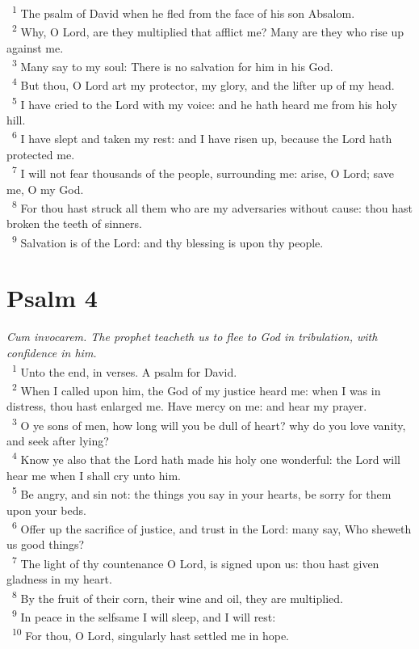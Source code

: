 \documentclass[a5paper,12pt]{article}
\begin{document}
\begin{multicols*}{2}
~\textsuperscript{1} The psalm of David when he fled from the face of his son Absalom.\\
~\textsuperscript{2} Why, O Lord, are they multiplied that afflict me? Many are they who rise up against me.\\
~\textsuperscript{3} Many say to my soul: There is no salvation for him in his God.\\
~\textsuperscript{4} But thou, O Lord art my protector, my glory, and the lifter up of my head.\\
~\textsuperscript{5} I have cried to the Lord with my voice: and he hath heard me from his holy hill.\\
~\textsuperscript{6} I have slept and taken my rest: and I have risen up, because the Lord hath protected me.\\
~\textsuperscript{7} I will not fear thousands of the people, surrounding me: arise, O Lord; save me, O my God.\\
~\textsuperscript{8} For thou hast struck all them who are my adversaries without cause: thou hast broken the teeth of sinners.\\
~\textsuperscript{9} Salvation is of the Lord: and thy blessing is upon thy people.\\

\section{Psalm 4}
\label{sec:org0904b75}
\emph{Cum invocarem. The prophet teacheth us to flee to God in tribulation, with confidence in him.}\\

~\textsuperscript{1} Unto the end, in verses. A psalm for David.\\
~\textsuperscript{2} When I called upon him, the God of my justice heard me: when I was in distress, thou hast enlarged me. Have mercy on me: and hear my prayer.\\
~\textsuperscript{3} O ye sons of men, how long will you be dull of heart? why do you love vanity, and seek after lying?\\
~\textsuperscript{4} Know ye also that the Lord hath made his holy one wonderful: the Lord will hear me when I shall cry unto him.\\
~\textsuperscript{5} Be angry, and sin not: the things you say in your hearts, be sorry for them upon your beds.\\
~\textsuperscript{6} Offer up the sacrifice of justice, and trust in the Lord: many say, Who sheweth us good things?\\
~\textsuperscript{7} The light of thy countenance O Lord, is signed upon us: thou hast given gladness in my heart.\\
~\textsuperscript{8} By the fruit of their corn, their wine and oil, they are multiplied.\\
~\textsuperscript{9} In peace in the selfsame I will sleep, and I will rest:\\
~\textsuperscript{10} For thou, O Lord, singularly hast settled me in hope.\\


\end{multicols*}
\end{document}

